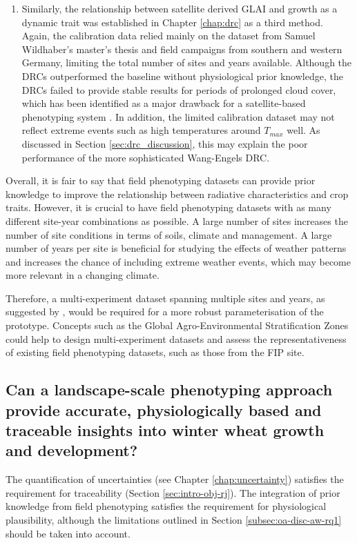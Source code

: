 \begin{enumerate}
\item Similarly, the relationship between satellite derived \gls{GLAI} and growth as a dynamic trait was established in Chapter \ref{chap:drc} as a third method. Again, the calibration data relied mainly on the dataset from Samuel Wildhaber's master's thesis and field campaigns from southern and western Germany, limiting the total number of sites and years available. Although the \gls{DRC}s outperformed the baseline without physiological prior knowledge, the \gls{DRC}s failed to provide stable results for periods of prolonged cloud cover, which has been identified as a major drawback for a satellite-based phenotyping system \citep{zhang_high-resolution_2020}. In addition, the limited calibration dataset may not reflect extreme events such as high temperatures around $T_{max}$ well. As discussed in Section \ref{sec:drc_discussion}, this may explain the poor performance of the more sophisticated Wang-Engels \gls{DRC}.

\end{enumerate}

Overall, it is fair to say that field phenotyping datasets can provide prior knowledge to improve the relationship between radiative characteristics and crop traits. However, it is crucial to have field phenotyping datasets with as many different site-year combinations as possible. A large number of sites increases the number of site conditions in terms of soils, climate and management. A large number of years per site is beneficial for studying the effects of weather patterns and increases the chance of including extreme weather events, which may become more relevant in a changing climate.

Therefore, a multi-experiment dataset spanning multiple sites and years, as suggested by \cite{smith_scaling_2021}, would be required for a more robust parameterisation of the prototype. Concepts such as the Global Agro-Environmental Stratification Zones \cite{muecher_new_2016} could help to design multi-experiment datasets and assess the representativeness of existing field phenotyping datasets, such as those from the FIP site.

\subsection{Can a landscape-scale phenotyping approach provide accurate, physiologically based and traceable insights into winter wheat growth and development?}

The quantification of uncertainties (see Chapter \ref{chap:uncertainty}) satisfies the requirement for traceability (Section \ref{sec:intro-obj-rj}). The integration of prior knowledge from field phenotyping satisfies the requirement for physiological plausibility, although the limitations outlined in Section \ref{subsec:oa-disc-aw-rq1} should be taken into account.

